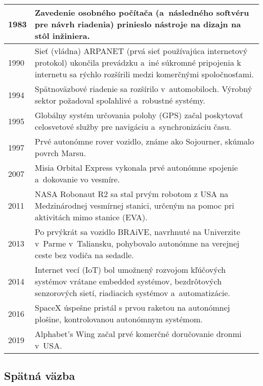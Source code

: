 \documentclass[a4paper, 10pt, ]{article}
\begin{document}
\begin{flushleft}
\begin{longtable}{  @{}  l @{\extracolsep{\fill}} p{}<{\raggedright} @{}   }
    1983 & Zavedenie osobného počítača (a~následného softvéru pre návrh riadenia) prinieslo nástroje na dizajn na stôl inžiniera. \\  \midrule
    1990 & Sieť (vládna) ARPANET (prvá sieť používajúca internetový protokol) ukončila prevádzku a~iné súkromné pripojenia k internetu sa rýchlo rozšírili medzi komerčnými spoločnosťami. \\  \midrule
    1994 & Spätnoväzbové riadenie sa rozšírilo v~automobiloch. Výrobný sektor požadoval spoľahlivé a~robustné systémy. \\  \midrule
    1995 & Globálny systém určovania polohy (GPS) začal poskytovať celosvetové služby pre navigáciu a~synchronizáciu času. \\  \midrule
    1997 & Prvé autonómne rover vozidlo, známe ako Sojourner, skúmalo povrch Marsu. \\  \midrule
    2007 & Misia Orbital Express vykonala prvé autonómne spojenie a~dokovanie vo vesmíre. \\  \midrule
    2011 & NASA Robonaut R2 sa stal prvým robotom z USA na Medzinárodnej vesmírnej stanici, určeným na pomoc pri aktivitách mimo stanice (EVA). \\  \midrule
    2013 & Po prvýkrát sa vozidlo BRAiVE, navrhnuté na Univerzite v~Parme v~Taliansku, pohybovalo autonómne na verejnej ceste bez vodiča na sedadle. \\  \midrule
    2014 & Internet vecí (IoT) bol umožnený rozvojom kľúčových systémov vrátane embedded systémov, bezdrôtových senzorových sietí, riadiacich systémov a~automatizácie. \\  \midrule
    2016 & SpaceX úspešne pristál s prvou raketou na autonómnej plošine, kontrolovanou autonómnym systémom. \\  \midrule
    2019 & Alphabet’s Wing začal prvé komerčné doručovanie dronmi v~USA. \\  
    \bottomrule    
\end{longtable}


\end{flushleft}










\subsection{Spätná väzba}
\end{document}
